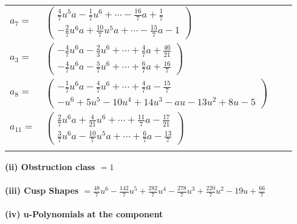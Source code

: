 \documentclass[1p]{elsarticle_modified}
\theoremstyle{definition}
\begin{document}
\begin{tabular}{m{7pt} m{180pt} m{7pt} m{180pt} }
\flushright $a_{7}=$&$\begin{pmatrix}\frac{4}{7} u^5 a-\frac{1}{7} u^6+\cdots-\frac{16}{7} a+\frac{1}{7}\\-\frac{2}{7} u^6 a+\frac{10}{7} u^5 a+\cdots-\frac{15}{7} a-1\end{pmatrix}$ \\
\flushright $a_{3}=$&$\begin{pmatrix}-\frac{4}{7} u^6 a-\frac{2}{3} u^6+\cdots+\frac{4}{7} a+\frac{46}{21}\\-\frac{4}{7} u^6 a-\frac{5}{7} u^6+\cdots+\frac{6}{7} a+\frac{16}{7}\end{pmatrix}$ \\
\flushright $a_{8}=$&$\begin{pmatrix}-\frac{1}{7} u^6 a-\frac{4}{7} u^6+\cdots+\frac{4}{7} a-\frac{15}{7}\\- u^6+5 u^5-10 u^4+14 u^3- a u-13 u^2+8 u-5\end{pmatrix}$ \\
\flushright $a_{11}=$&$\begin{pmatrix}\frac{2}{7} u^6 a+\frac{4}{21} u^6+\cdots+\frac{11}{7} a-\frac{17}{21}\\\frac{3}{7} u^6 a-\frac{10}{7} u^5 a+\cdots+\frac{6}{7} a-\frac{13}{7}\end{pmatrix}$\\&\end{tabular}
\flushleft \textbf{(ii) Obstruction class $= 1$}\\~\\
\flushleft \textbf{(iii) Cusp Shapes $= \frac{48}{7} u^6-\frac{142}{7} u^5+\frac{282}{7} u^4-\frac{278}{7} u^3+\frac{220}{7} u^2-19 u+\frac{66}{7}$}\\~\\
\newpage\renewcommand{\arraystretch}{1}
\flushleft \textbf{(iv) u-Polynomials at the component}\newline \\
\end{document}
